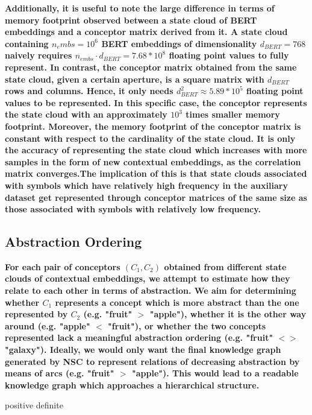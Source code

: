 \textbf{Additionally, it is useful to note the large difference in terms of memory footprint observed between a state cloud of BERT embeddings and a conceptor matrix derived from it. A state cloud containing $n_embs = 10^6$ BERT embeddings of dimensionality $d_{BERT}=768$ naively requires $n_{embs} \cdot d_{BERT} = 7.68 * 10^8$ floating point values to fully represent. In contrast, the conceptor matrix obtained from the same state cloud, given a certain aperture, is a square matrix with $d_{BERT}$ rows and columns. Hence, it only needs $d_{BERT}^2 \approx 5.89 * 10^5$ floating point values to be represented. In this specific case, the conceptor represents the state cloud with an approximately $10^3$ times smaller memory footprint. Moreover, the memory footprint of the conceptor matrix is constant with respect to the cardinality of the state cloud. It is only the accuracy of representing the state cloud which increases with more samples in the form of new contextual embeddings, as the correlation matrix converges.The implication of this is that state clouds associated with symbols which have relatively high frequency in the auxiliary dataset get represented through conceptor matrices of the same size as those associated with symbols with relatively low frequency.}

\subsection{Abstraction Ordering}

\textbf{For each pair of conceptors $(C_1, C_2)$ obtained from different state clouds of contextual embeddings, we attempt to estimate how they relate to each other in terms of abstraction. We aim for determining whether $C_1$ represents a concept which is more abstract than the one represented by $C_2$ (e.g. "fruit" $>$ "apple"), whether it is the other way around (e.g. "apple" $<$ "fruit"), or whether the two concepts represented lack a meaningful abstraction ordering (e.g. "fruit" $<>$ "galaxy"). Ideally, we would only want the final knowledge graph generated by NSC to represent relations of decreasing abstraction by means of arcs (e.g. "fruit" $>$ "apple"). This would lead to a readable knowledge graph which approaches a hierarchical structure.}

positive definite

